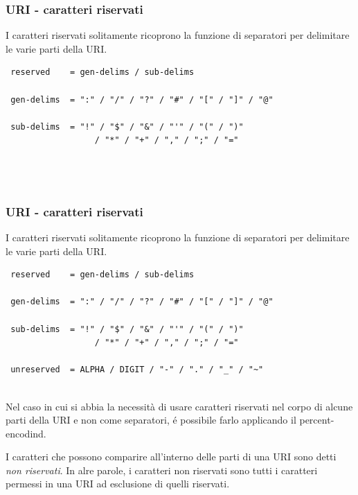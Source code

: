 \documentclass[8pt]{beamer}
\begin{document}
\begin{frame}[fragile]
	\frametitle{URI - caratteri riservati}
	
	I caratteri riservati solitamente ricoprono la funzione di 
	separatori per delimitare le varie parti della URI.
	
	\begin{verbatim}
 reserved    = gen-delims / sub-delims
 
 gen-delims  = ":" / "/" / "?" / "#" / "[" / "]" / "@"

 sub-delims  = "!" / "$" / "&" / "'" / "(" / ")"
                  / "*" / "+" / "," / ";" / "=" 
                  

                  
	\end{verbatim}
	\vspace{\baselineskip}
	

\end{frame}

\begin{frame}[fragile]
	\frametitle{URI - caratteri riservati}
	
	I caratteri riservati solitamente ricoprono la funzione di 
	separatori per delimitare le varie parti della URI.
	
	\begin{verbatim}
 reserved    = gen-delims / sub-delims
 
 gen-delims  = ":" / "/" / "?" / "#" / "[" / "]" / "@"

 sub-delims  = "!" / "$" / "&" / "'" / "(" / ")"
                  / "*" / "+" / "," / ";" / "=" 
                  
 unreserved  = ALPHA / DIGIT / "-" / "." / "_" / "~"
                  
	\end{verbatim}
	\vspace{\baselineskip}
	
	Nel caso in cui si abbia la necessit\`a di usare caratteri riservati
	nel corpo di alcune parti della URI e non come separatori, \'e possibile
	farlo applicando il percent-encodind.
	\vspace{\baselineskip}

 	I caratteri che possono comparire all'interno delle parti di una URI
 	sono detti \emph{non riservati}. In alre parole, i caratteri non riservati
 	sono tutti i caratteri permessi in una URI ad esclusione di quelli riservati.	
\end{frame}
\end{document}

